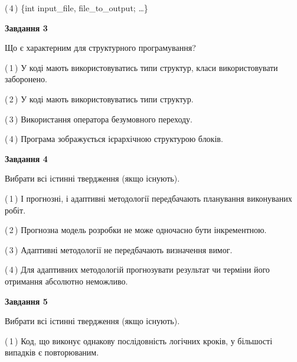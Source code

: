 \documentclass[10pt, ukrainian]{article}
\begin{document}
{\begin {large}
(\,4\,) \{int input\_file, file\_to\_output; …\}%


{\begin {center}\textbf{Завдання 3}\end {center}}\par
Що є характерним для структурного програмування?\par
\vspace{2mm}



(\,1\,) У коді мають використовуватись типи структур, класи використовувати заборонено. %



(\,2\,) У коді мають використовуватись типи структур. %



(\,3\,) Використання оператора безумовного переходу. %



(\,4\,) Програма зображується ієрархічною структурою блоків.%


{\begin {center}\textbf{Завдання 4}\end {center}}\par
Вибрати всі істинні твердження (якщо існують).\par
\vspace{2mm}



(\,1\,) І прогнозні, і адаптивні методології передбачають планування виконуваних робіт. %



(\,2\,) Прогнозна модель розробки не може одночасно бути інкрементною. %



(\,3\,) Адаптивні методології не передбачають визначення вимог. %



(\,4\,) Для адаптивних методологій прогнозувати результат чи терміни його отримання абсолютно неможливо. %


{\begin {center}\textbf{Завдання 5}\end {center}}\par
Вибрати всі істинні твердження (якщо існують).\par
\vspace{2mm}



(\,1\,) Код, що виконує однакову послідовність логічних кроків, у більшості випадків є повторюваним.%




\end{large}}
\end{document}
